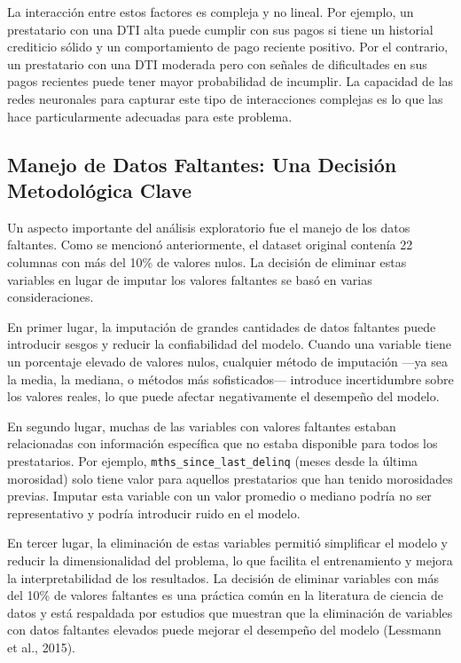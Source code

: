 \documentclass[12pt,a4paper]{article}
\begin{document}
La interacción entre estos factores es compleja y no lineal. Por ejemplo, un prestatario con una DTI alta puede cumplir con sus pagos si tiene un historial crediticio sólido y un comportamiento de pago reciente positivo. Por el contrario, un prestatario con una DTI moderada pero con señales de dificultades en sus pagos recientes puede tener mayor probabilidad de incumplir. La capacidad de las redes neuronales para capturar este tipo de interacciones complejas es lo que las hace particularmente adecuadas para este problema.

\subsection{Manejo de Datos Faltantes: Una Decisión Metodológica Clave}

Un aspecto importante del análisis exploratorio fue el manejo de los datos faltantes. Como se mencionó anteriormente, el dataset original contenía 22 columnas con más del 10\% de valores nulos. La decisión de eliminar estas variables en lugar de imputar los valores faltantes se basó en varias consideraciones.

En primer lugar, la imputación de grandes cantidades de datos faltantes puede introducir sesgos y reducir la confiabilidad del modelo. Cuando una variable tiene un porcentaje elevado de valores nulos, cualquier método de imputación ---ya sea la media, la mediana, o métodos más sofisticados--- introduce incertidumbre sobre los valores reales, lo que puede afectar negativamente el desempeño del modelo.

En segundo lugar, muchas de las variables con valores faltantes estaban relacionadas con información específica que no estaba disponible para todos los prestatarios. Por ejemplo, \texttt{mths\_since\_last\_delinq} (meses desde la última morosidad) solo tiene valor para aquellos prestatarios que han tenido morosidades previas. Imputar esta variable con un valor promedio o mediano podría no ser representativo y podría introducir ruido en el modelo.

En tercer lugar, la eliminación de estas variables permitió simplificar el modelo y reducir la dimensionalidad del problema, lo que facilita el entrenamiento y mejora la interpretabilidad de los resultados. La decisión de eliminar variables con más del 10\% de valores faltantes es una práctica común en la literatura de ciencia de datos y está respaldada por estudios que muestran que la eliminación de variables con datos faltantes elevados puede mejorar el desempeño del modelo (Lessmann et al., 2015).
\end{document}
